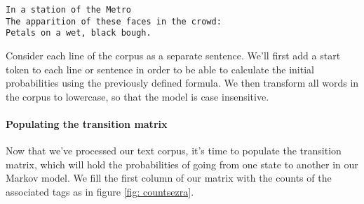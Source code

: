 \documentclass[12pt]{article}
\begin{document}
\begin{verbatim}
In a station of the Metro
The apparition of these faces in the crowd:
Petals on a wet, black bough.
\end{verbatim}

Consider each line of the corpus as a separate sentence. We'll first add a start token to each line or sentence in order to be able to calculate the initial probabilities using the previously defined formula. We then transform all words in the corpus to lowercase, so that the model is case insensitive.

\paragraph{Populating the transition matrix} Now that we've processed our text corpus, it's time to populate the transition matrix, which will hold the probabilities of going from one state to another in our Markov model. We fill the first column of our matrix with the counts of the associated tags as in figure \ref{fig: countsezra}.
\end{document}
